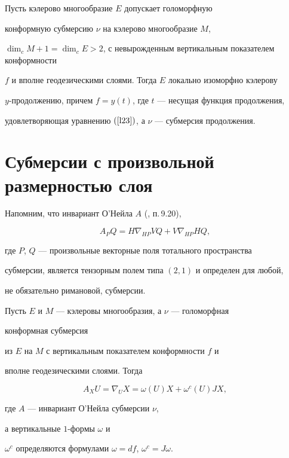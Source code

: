 \begin{thms}\label{th2.5}


Пусть кэлерово многообразие $E$ допускает голоморфную


конформную субмерсию $\nu$ на кэлерово многообразие $M$,


$\dim_cM+1=\dim_cE>2$, с невырожденным вертикальным показателем конформности


$f$ и вполне геодезическими слоями. Тогда $E$ локально изоморфно кэлерову


$y$-продолжению, причем $f=y(t)$, где $t$ --- несущая функция продолжения,


удовлетворяющая уравнению $(\ref{l23})$, а $\nu$ --- субмерсия продолжения.


\end{thms}





\section{Субмерсии с произвольной размерностью слоя}





Напомним, что инвариант О'Нейла $A$ (\cite{B}, п.\,9.20),


$$


A_PQ=H\nabla_{HP}VQ+V\nabla_{HP}HQ,


$$


где $P$, $Q$ --- произвольные векторные поля тотального пространства


субмерсии, является тензорным полем типа $(2,1)$ и определен для любой,


не обязательно римановой, субмерсии.





\begin{lems}\label{lm3.1}


Пусть $E$ и $M$ --- кэлеровы многообразия, а $\nu$ --- голоморфная


конформная субмерсия


из $E$ на $M$ с вертикальным показателем конформности $f$ и


вполне геодезическими слоями. Тогда


$$


A_XU=\nabla_UX=\omega (U)X+\omega^c(U)JX,


$$


где $A$ --- инвариант О'Нейла субмерсии $\nu$,


а вертикальные $1$-формы $\omega$ и


$\omega^c$ определяются формулами $\omega=df$, $\omega^c=J\omega$.


\end{lems}





